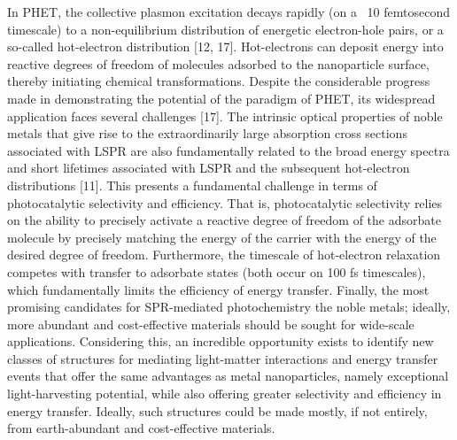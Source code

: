 \documentclass[journal=jacsat,manuscript=article]{achemso}
\begin{document}
   In PHET, the collective plasmon excitation decays rapidly (on a ~10 femtosecond timescale) to a non-equilibrium distribution of energetic electron-hole pairs, or a so-called hot-electron distribution [12, 17].  Hot-electrons can deposit energy into reactive degrees of freedom of molecules adsorbed to the nanoparticle surface, thereby initiating chemical transformations.  Despite the considerable progress made in demonstrating the potential of the paradigm of PHET, its widespread application faces several challenges [17]. The intrinsic optical properties of noble metals that give rise to the extraordinarily large absorption cross sections associated with LSPR are also fundamentally related to the broad energy spectra and short lifetimes associated with LSPR and the subsequent hot-electron distributions [11]. This presents a fundamental challenge in terms of photocatalytic selectivity and efficiency.  That is, photocatalytic selectivity relies on the ability to precisely activate a reactive degree of freedom of the adsorbate molecule by precisely matching the energy of the carrier with the energy of the desired degree of freedom. Furthermore, the timescale of hot-electron relaxation competes with transfer to adsorbate states (both occur on 100 fs timescales), which fundamentally limits the efficiency of energy transfer.  Finally, the most promising candidates for SPR-mediated photochemistry the noble metals; ideally, more abundant and cost-effective materials should be sought for wide-scale applications.
Considering this, an incredible opportunity exists to identify new classes of structures for mediating light-matter interactions and energy transfer events that offer the same advantages as metal nanoparticles, namely exceptional light-harvesting potential, while also offering greater selectivity and efficiency in energy transfer.  Ideally, such structures could be made mostly, if not entirely, from earth-abundant and cost-effective materials.  
\end{document}
